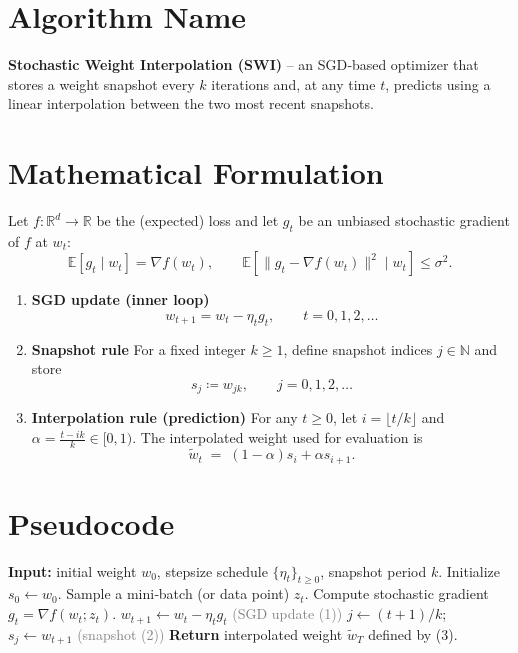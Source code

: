 \documentclass{article}
\begin{document}
\section*{Algorithm Name}
\textbf{Stochastic Weight Interpolation (SWI)} – an SGD‐based optimizer that stores a weight snapshot every $k$ iterations and, at any time $t$, predicts using a linear interpolation between the two most recent snapshots.

\section*{Mathematical Formulation}
Let $f:\mathbb{R}^d\rightarrow\mathbb{R}$ be the (expected) loss and let $g_t$ be an unbiased stochastic gradient of $f$ at $w_t$:
\[
\mathbb{E}[g_t\mid w_t]=\nabla f(w_t),\qquad 
\mathbb{E}[\|g_t-\nabla f(w_t)\|^2\mid w_t]\le\sigma^2 .
\]

\begin{enumerate}
    \item \textbf{SGD update (inner loop)}  
    \[
    w_{t+1}=w_t-\eta_t g_t,\qquad t=0,1,2,\dots
    \tag{1}
    \]
    \item \textbf{Snapshot rule}  
    For a fixed integer $k\ge 1$, define snapshot indices $j\in\mathbb{N}$ and store
    \[
    s_j \coloneqq w_{jk},\qquad j=0,1,2,\dots
    \tag{2}
    \]
    \item \textbf{Interpolation rule (prediction)}  
    For any $t\ge 0$, let $i=\big\lfloor t/k\big\rfloor$ and $\alpha =\frac{t-ik}{k}\in[0,1)$. The interpolated weight used for evaluation is
    \[
    \tilde w_t \;=\;(1-\alpha)s_i+\alpha s_{i+1}.
    \tag{3}
    \]
\end{enumerate}

\section*{Pseudocode}
\begin{algorithm}[H]
\caption{Stochastic Weight Interpolation (SWI)}
\begin{algorithmic}[1]
\STATE \textbf{Input:} initial weight $w_0$, stepsize schedule $\{\eta_t\}_{t\ge0}$, snapshot period $k$.
\STATE Initialize $s_0\gets w_0$.
    \STATE Sample a mini‑batch (or data point) $z_t$.
    \STATE Compute stochastic gradient $g_t=\nabla f(w_t;z_t)$.
    \STATE $w_{t+1}\gets w_t-\eta_t g_t$ \hfill \textcolor{gray}{(SGD update (1))}
        \STATE $j\gets (t+1)/k$; \quad $s_j\gets w_{t+1}$ \hfill \textcolor{gray}{(snapshot (2))}
    \ENDIF
\ENDFOR
\STATE \textbf{Return} interpolated weight $\tilde w_T$ defined by (3).
\end{algorithmic}
\end{algorithm}
\end{document}
